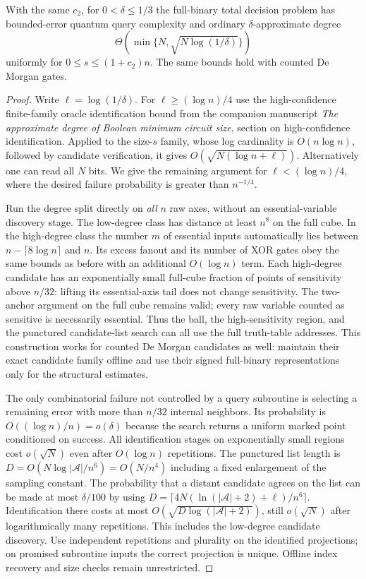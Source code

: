 \begin{theorem}\label{th:fullconfidence}
With the same $c_2$, for $0<\delta\le1/3$ the full-binary total decision problem has bounded-error quantum query complexity and ordinary $\delta$-approximate degree
\[
  \Theta\left(\min\{N,\sqrt{N\log(1/\delta)}\}\right)
\]
uniformly for $0\le s\le(1+c_2)n$. The same bounds hold with counted De Morgan gates.
\end{theorem}
\begin{proof}
\setlength{\emergencystretch}{1em}
Write $\ell=\log(1/\delta)$. For $\ell\ge (\log n)/4$ use the high-confidence finite-family oracle identification bound from the companion manuscript \emph{The approximate degree of Boolean minimum circuit size}, section on high-confidence identification. Applied to the size-$s$ family, whose log cardinality is $O(n\log n)$, followed by candidate verification, it gives $O(\sqrt{N(\log n+\ell)})$. Alternatively one can read all $N$ bits. We give the remaining argument for $\ell<(\log n)/4$, where the desired failure probability is greater than $n^{-1/4}$.

Run the degree split directly on \emph{all} $n$ raw axes, without an essential-variable discovery stage. The low-degree class has distance at least $n^8$ on the full cube. In the high-degree class the number $m$ of essential inputs automatically lies between $n-\lceil8\log n\rceil$ and $n$. Its excess fanout and its number of XOR gates obey the same bounds as before with an additional $O(\log n)$ term. Each high-degree candidate has an exponentially small full-cube fraction of points of sensitivity above $n/32$: lifting its essential-axis tail does not change sensitivity. The two-anchor argument on the full cube remains valid; every raw variable counted as sensitive is necessarily essential. Thus the ball, the high-sensitivity region, and the punctured candidate-list search can all use the full truth-table addresses. This construction works for counted De Morgan candidates as well: maintain their exact candidate family offline and use their signed full-binary representations only for the structural estimates.

The only combinatorial failure not controlled by a query subroutine is selecting a remaining error with more than $n/32$ internal neighbors. Its probability is $O((\log n)/n)=o(\delta)$ because the search returns a uniform marked point conditioned on success. All identification stages on exponentially small regions cost $o(\sqrt N)$ even after $O(\log n)$ repetitions. The punctured list length is $D=O(N\log|\mathcal A|/n^6)=O(N/n^4)$ including a fixed enlargement of the sampling constant. The probability that a distant candidate agrees on the list can be made at most $\delta/100$ by using $D=\lceil 4N(\ln(|\mathcal A|+2)+\ell)/n^6\rceil$. Identification there costs at most $O(\sqrt{D\log(|\mathcal A|+2)})$, still $o(\sqrt N)$ after logarithmically many repetitions. This includes the low-degree candidate discovery. Use independent repetitions and plurality on the identified projections; on promised subroutine inputs the correct projection is unique. Offline index recovery and size checks remain unrestricted.


\end{proof}
